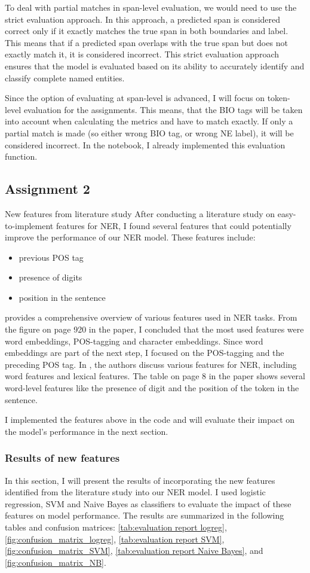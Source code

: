 \documentclass[11pt]{article}
\begin{document}
To deal with partial matches in span-level evaluation, we would need to use the strict evaluation approach.
In this approach, a predicted span is considered correct only if it exactly matches the true span in both boundaries and label.
This means that if a predicted span overlaps with the true span but does not exactly match it, it is considered incorrect.
This strict evaluation approach ensures that the model is evaluated based on its ability to accurately identify and classify complete named entities.

Since the option of evaluating at span-level is advanced, I will focus on token-level evaluation for the assignments.
This means, that the BIO tags will be taken into account when calculating the metrics and have to match exactly.
If only a partial match is made (so either wrong BIO tag, or wrong NE label), it will be considered incorrect.
In the notebook, I already implemented this evaluation function.


\subsection*{Assignment 2} New features from literature study
After conducting a literature study on easy-to-implement features for NER, I found several features that could potentially improve the performance of our NER model.
These features include:
\begin{itemize}
    \item previous POS tag
    \item presence of digits
    \item position in the sentence
\end{itemize}

\cite{Warto2024SystematicLR} provides a comprehensive overview of various features used in NER tasks.
From the figure on page 920 in the paper, I concluded that the most used features were word embeddings, POS-tagging and character embeddings.
Since word embeddings are part of the next step, I focused on the POS-tagging and the preceding POS tag.
In \cite{Nadeau2007ASO}, the authors discuss various features for NER, including word features and lexical features.
The table on page 8 in the paper shows several word-level features like the presence of digit and the position of the token in the sentence.

I implemented the features above in the code and will evaluate their impact on the model's performance in the next section.

\subsubsection*{Results of new features}
In this section, I will present the results of incorporating the new features identified from the literature study into our NER model.
I used logistic regression, SVM and Naive Bayes as classifiers to evaluate the impact of these features on model performance.
The results are summarized in the following tables and confusion matrices: \ref{tab:evaluation report logreg}, \ref{fig:confusion_matrix_logreg}, \ref{tab:evaluation report SVM}, \ref{fig:confusion_matrix_SVM}, \ref{tab:evaluation report Naive Bayes}, and \ref{fig:confusion_matrix_NB}.
\end{document}
